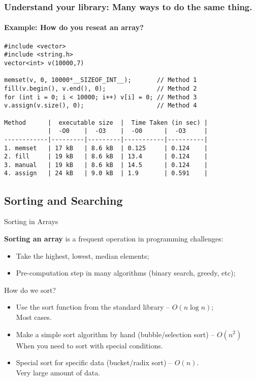 \begin{frame}[fragile]
  \frametitle{Understand your library: Many ways to do the same thing.}
  \framesubtitle{Example: How do you reseat an array?}
{\smaller
\begin{verbatim}
#include <vector>
#include <string.h>
vector<int> v(10000,7)

memset(v, 0, 10000*__SIZEOF_INT__);       // Method 1
fill(v.begin(), v.end(), 0);              // Method 2
for (int i = 0; i < 10000; i++) v[i] = 0; // Method 3
v.assign(v.size(), 0);                    // Method 4

Method      |  executable size  |  Time Taken (in sec) |
            |  -O0    |  -O3    |  -O0      |  -O3     |
------------|---------|---------|-----------|----------|
1. memset   | 17 kB   | 8.6 kB  | 0.125     | 0.124    |
2. fill     | 19 kB   | 8.6 kB  | 13.4      | 0.124    |
3. manual   | 19 kB   | 8.6 kB  | 14.5      | 0.124    |
4. assign   | 24 kB   | 9.0 kB  | 1.9       | 0.591    |
\end{verbatim}
}
\end{frame}

\subsection{Sorting and Searching}

\begin{frame}{Sorting in Arrays}

{\bf Sorting an array} is a frequent operation in programming challenges:
\begin{itemize}
  \item Take the highest, lowest, median elements;
  \item Pre-computation step in many algorithms (binary search, greedy, etc);
\end{itemize}\bigskip

How do we sort?
\begin{itemize}
  \item Use the sort function from the standard library -- $O(n\log n)$;\\
  \hfill Most cases.\medskip

  \item Make a simple sort algorithm by hand (bubble/selection sort) -- $O(n^2)$\\
  \hfill When you need to sort with special conditions.\medskip

  \item Special sort for specific data (bucket/radix sort) -- $O(n)$.\\
  \hfill Very large amount of data.
\end{itemize}
\end{frame}


